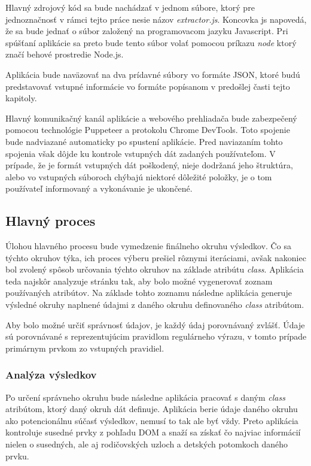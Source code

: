 Hlavný zdrojový kód sa bude nachádzať v jednom súbore, ktorý pre jednoznačnosť v rámci tejto práce nesie názov \textit{extractor.js}. Koncovka js napovedá, že sa bude jednať o súbor založený na programovacom jazyku Javascript. Pri spúšťaní aplikácie sa preto bude tento súbor volať pomocou príkazu \textit{node} ktorý značí behové prostredie Node.js.

Aplikácia bude naväzovať na dva prídavné súbory vo formáte JSON, ktoré budú predstavovať vstupné informácie vo formáte popísanom v predošlej časti tejto kapitoly. 

Hlavný komunikačný kanál aplikácie a webového prehliadača bude zabezpečený pomocou technológie Puppeteer a protokolu Chrome DevTools. Toto spojenie bude nadviazané automaticky po spustení aplikácie. Pred naviazaním tohto spojenia však dôjde ku kontrole vstupných dát zadaných používateľom. V prípade, že je formát vstupných dát poškodený, nieje dodržaná jeho štruktúra, alebo vo vstupných súboroch chýbajú niektoré dôležité položky, je o tom používateľ informovaný a vykonávanie je ukončené.

\subsection{Hlavný proces}

Úlohou hlavného procesu bude vymedzenie finálneho okruhu výsledkov. Čo sa týchto okruhov týka, ich proces výberu prešiel rôznymi iteráciami, avšak nakoniec bol zvolený spôsob určovania týchto okruhov na základe atribútu \textit{class}. Aplikácia teda najskôr analyzuje stránku tak, aby bolo možné vygenerovať zoznam používaných atribútov. Na základe tohto zoznamu následne aplikácia generuje výsledné okruhy naplnené údajmi z daného okruhu definovaného \textit{class} atribútom. 

Aby bolo možné určiť správnosť údajov, je každý údaj porovnávaný zvlášť. Údaje sú porovnávané s reprezentujúcim pravidlom regulárneho výrazu, v tomto prípade primárnym prvkom zo vstupných pravidiel.


\subsubsection{Analýza výsledkov}

Po určení správneho okruhu bude následne aplikácia pracovať s daným \textit{class} atribútom, ktorý daný okruh dát definuje. Aplikácia berie údaje daného okruhu ako potencionálnu súčasť výsledkov, nemusí to tak ale byť  vždy. Preto aplikácia kontroluje susedné prvky z pohľadu DOM a snaží sa získať čo najviac informácií nielen o susedných, ale aj rodičovských uzloch a detských potomkoch daného prvku.

